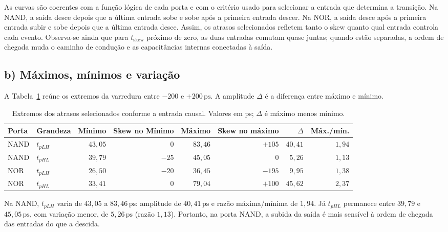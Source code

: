 \documentclass[a4paper]{article}
\begin{document}
As curvas são coerentes com a função lógica de cada porta e com o critério usado para selecionar a entrada que determina a transição. Na NAND, a saída desce depois que a última entrada sobe e sobe após a primeira entrada descer. Na NOR, a saída desce após a primeira entrada subir e sobe depois que a última entrada desce. Assim, os atrasos selecionados refletem tanto o skew quanto qual entrada controla cada evento. Observa-se ainda que para $t_{\mathrm{skew}}$ próximo de zero, as duas entradas comutam quase juntas; quando estão separadas, a ordem de chegada muda o caminho de condução e as capacitâncias internas conectadas à saída.

\subsection{b) Máximos, mínimos e variação}

A Tabela~\ref{tab:skew-comparacao-final} reúne os extremos da varredura entre $-200$ e $+200\,\mathrm{ps}$. A amplitude $\Delta$ é a diferença entre máximo e mínimo.

\begin{table}[!htbp]
    \centering
    \small
    \caption{Extremos dos atrasos selecionados conforme a entrada causal. Valores em ps; $\Delta$ é máximo menos mínimo.}
    \label{tab:skew-comparacao-final}
    \begin{tabular}{llrrrrrr}
        \hline
        Porta & Grandeza & Mínimo & Skew no Mínimo & Máximo & Skew no máximo & $\Delta$ & Máx./mín.\\
        \hline
        NAND & $t_{pLH}$ & $43{,}05$ & $0$ & $83{,}46$ & $+105$ & $40{,}41$ & $1{,}94$\\
        NAND & $t_{pHL}$ & $39{,}79$ & $-25$ & $45{,}05$ & $0$ & $5{,}26$ & $1{,}13$\\
        NOR  & $t_{pLH}$ & $26{,}50$ & $-20$ & $36{,}45$ & $-195$ & $9{,}95$ & $1{,}38$\\
        NOR  & $t_{pHL}$ & $33{,}41$ & $0$ & $79{,}04$ & $+100$ & $45{,}62$ & $2{,}37$\\
        \hline
    \end{tabular}
\end{table}

Na NAND, $t_{pLH}$ varia de $43{,}05$ a $83{,}46\,\mathrm{ps}$: amplitude de $40{,}41\,\mathrm{ps}$ e razão máxima/mínima de $1{,}94$. Já $t_{pHL}$ permanece entre $39{,}79$ e $45{,}05\,\mathrm{ps}$, com variação menor, de $5{,}26\,\mathrm{ps}$ (razão $1{,}13$). Portanto, na porta NAND, a subida da saída é mais sensível à ordem de chegada das entradas do que a descida.
\end{document}
